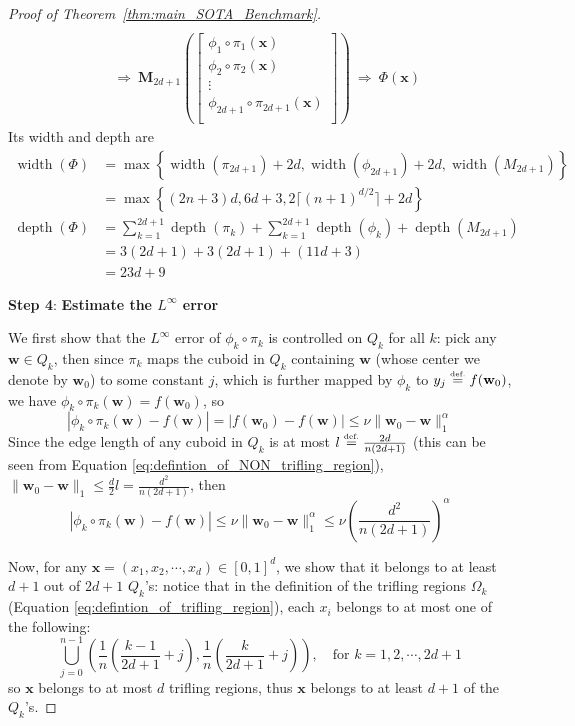 \documentclass{article}
\numberwithin{equation}{section}
\theoremstyle{definition}
\newcommand{\eqdef}{\ensuremath{\stackrel{\mbox{\upshape\tiny def.}}{=}}}
\begin{document}
\begin{proof}[{Proof of Theorem~\ref{thm:main_SOTA_Benchmark}}]
\begin{align*}
\\
\ &\Longrightarrow \
\mathbf{M}_{2d+1} \left(
\begin{bmatrix}  \phi_1\circ\pi_1(\mathbf{x}) \\ \phi_2\circ\pi_2(\mathbf{x}) \\ \vdots \\ \phi_{2d+1}\circ\pi_{2d+1}(\mathbf{x}) \\ \end{bmatrix}
\right)
\ \Longrightarrow \
\Phi(\mathbf{x})
\end{align*}
Its width and depth are 
\begin{align*}
    \operatorname{width}(\Phi) 
    &= 
    \max\left\{\operatorname{width}(\pi_{2d+1})+2d,\operatorname{width}(\phi_{2d+1})+2d,\operatorname{width}(M_{2d+1})\right\} \\
    &= 
    \max\left\{(2n+3)d, 6d+3, 2\lceil (n+1)^{d/2} \rceil+2d \right\}
\end{align*}
\begin{align*}
    \operatorname{depth}(\Phi) &= \sum_{k=1}^{2d+1}\operatorname{depth}(\pi_k) + \sum_{k=1}^{2d+1}\operatorname{depth}(\phi_k) + \operatorname{depth}(M_{2d+1}) \\
    &= 3(2d+1)+3(2d+1)+(11d+3) \\
    &= 23d+9
\end{align*}

\textbf{Step 4}: \textbf{
Estimate the $L^{\infty}$ error
}

We first show that the $L^{\infty}$ error of $\phi_k\circ\pi_k$ is controlled on $Q_k$ for all $k$: pick any $\mathbf{w}\in Q_k$, then since $\pi_k$ maps the cuboid in $Q_k$ containing $\mathbf{w}$ (whose center we denote by $\mathbf{w}_0$) to some constant $j$, which is further mapped by $\phi_k$ to $y_j \eqdef f(\mathbf{w}_0)$, we have $\phi_k\circ\pi_k(\mathbf{w}) = f(\mathbf{w}_0)$, so
$$|\phi_k\circ\pi_k(\mathbf{w})-f(\mathbf{w})| = |f(\mathbf{w}_0)-f(\mathbf{w})| \le \nu \| \mathbf{w}_0-\mathbf{w} \|_1^{\alpha}$$
Since the edge length of any cuboid in $Q_k$ is at most $l \eqdef \frac{2d}{n(2d+1)}$ (this can be seen from Equation \ref{eq:defintion_of_NON_trifling_region}), $\| \mathbf{w}_0-\mathbf{w} \|_1 \le \frac{d}{2}l = \frac{d^2}{n(2d+1)}$, then
$$|\phi_k\circ\pi_k(\mathbf{w})-f(\mathbf{w})| \le \nu \| \mathbf{w}_0-\mathbf{w} \|_1^{\alpha} \le \nu \left( \frac{d^2}{n(2d+1)} \right)^{\alpha}$$

Now, for any $\mathbf{x}=(x_1,x_2,\cdots,x_d)\in[0,1]^d$, we show that it belongs to at least $d+1$ out of $2d+1$ $Q_k$'s: notice that in the definition of the trifling regions $\Omega_k$ (Equation \ref{eq:defintion_of_trifling_region}), each $x_i$ belongs to at most one of the following:
$$\bigcup_{j=0}^{n-1} \left(
\frac{1}{n} \left( \frac{k-1}{2d+1}+j \right) , 
\frac{1}{n} \left( \frac{k}{2d+1}+j \right) 
\right),
\quad \text{for } k=1,2,\cdots,2d+1 $$
so $\mathbf{x}$ belongs to at most $d$ trifling regions, thus $\mathbf{x}$ belongs to at least $d+1$ of the $Q_k$'s.


\end{proof}
\end{document}
